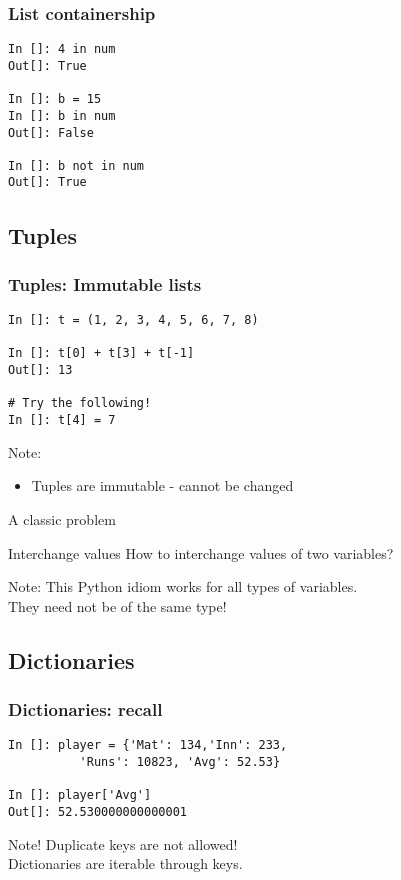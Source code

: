\documentclass[14pt,compress]{beamer}
\newcounter{time}
\newcommand{\inctime}[1]{\addtocounter{time}{#1}{\tiny \thetime\ m}}
\begin{document}
\begin{frame}[fragile]
\frametitle{List containership}
\begin{lstlisting}
In []: 4 in num
Out[]: True

In []: b = 15
In []: b in num
Out[]: False

In []: b not in num
Out[]: True
\end{lstlisting}
\end{frame}

\subsection{Tuples}
\begin{frame}[fragile]
\frametitle{Tuples: Immutable lists}
\begin{lstlisting}
In []: t = (1, 2, 3, 4, 5, 6, 7, 8)

In []: t[0] + t[3] + t[-1]
Out[]: 13

# Try the following!
In []: t[4] = 7 
\end{lstlisting}
\pause
\begin{block}{Note:}
\begin{itemize}
  \item Tuples are immutable - cannot be changed
\end{itemize}
\end{block}
  \inctime{10}
\end{frame}

\begin{frame}
  {A classic problem}
  \begin{block}
    {Interchange values}
    How to interchange values of two variables? 
  \end{block}
  \pause
  \begin{block}{Note:}
    This Python idiom works for all types of variables.\\
They need not be of the same type!
  \end{block}
\end{frame}

\subsection{Dictionaries}
\begin{frame}[fragile]
  \frametitle{Dictionaries: recall}
  \begin{lstlisting}
In []: player = {'Mat': 134,'Inn': 233,
          'Runs': 10823, 'Avg': 52.53}

In []: player['Avg']
Out[]: 52.530000000000001
  \end{lstlisting}
  \begin{block}{Note!}
    Duplicate keys are not allowed!\\
    Dictionaries are iterable through keys.
  \end{block}
\end{frame}
\end{document}
